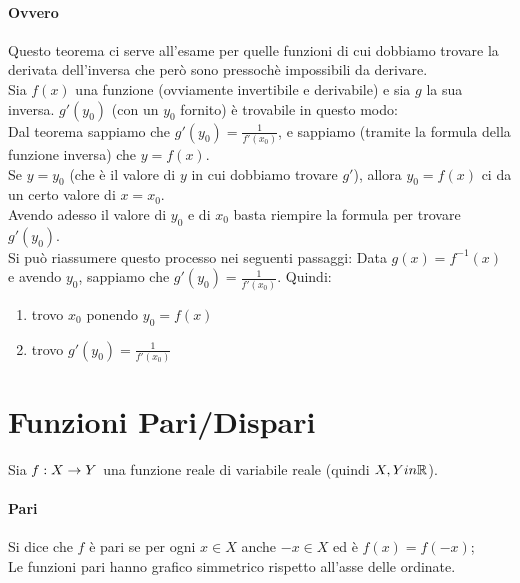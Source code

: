 \documentclass[12pt, a4paper, openany]{book}
\begin{document}
\paragraph*{Ovvero} Questo teorema ci serve all'esame per quelle funzioni di cui dobbiamo trovare la derivata dell'inversa che però sono pressochè impossibili da derivare.
\\Sia $f(x)$ una funzione (ovviamente invertibile e derivabile) e sia $g$ la sua inversa. 
$g'(y_0)$ (con un $y_0$ fornito) è trovabile in questo modo:
\\Dal teorema sappiamo che $g'(y_0) = \frac{1}{f'(x_0)}$, e sappiamo (tramite la formula della funzione inversa) che $y=f(x)$. 
\\Se $y=y_0$ (che è il valore di $y$ in cui dobbiamo trovare $g'$), allora $y_0= f(x)$ ci da un certo valore di $x=x_0$.
\\Avendo adesso il valore di $y_0$ e di $x_0$ basta riempire la formula per trovare $g'(y_0)$.
\\Si può riassumere questo processo nei seguenti passaggi: 
Data $g(x) = f^{-1}(x)$ e avendo $y_0$, sappiamo che $g'(y_0) = \frac{1}{f'(x_0)}$.
Quindi:
\begin{enumerate}
	\item trovo $x_0$ ponendo $y_0=f(x)$
	\item trovo $g'(y_0)=\frac{1}{f'(x_0)}$
\end{enumerate}
\section*{Funzioni Pari/Dispari}
Sia $f: X \rightarrow Y$ una funzione reale di variabile reale (quindi $X, Y in \mathbb{R}$).
\paragraph*{Pari}
Si dice che $f$ è pari se per ogni $x \in X$ anche $-x \in X$ ed è $f(x) = f(-x)$;
\\Le funzioni pari hanno grafico simmetrico rispetto all'asse delle ordinate.
\end{document}
